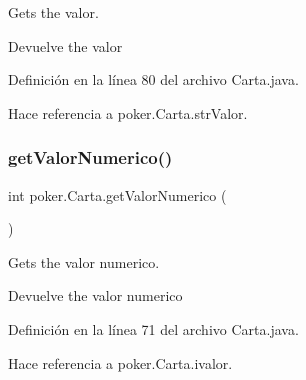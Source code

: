 Gets the valor. 

\begin{DoxyReturn}{Devuelve}
the valor 
\end{DoxyReturn}


Definición en la línea 80 del archivo Carta.\+java.


\begin{DoxyCode}{0}

\end{DoxyCode}


Hace referencia a poker.\+Carta.\+str\+Valor.

\mbox{\label{classpoker_1_1Carta_a24fcaa25f7ab08bdcece39332baaa00c}} 
\subsubsection{\texorpdfstring{getValorNumerico()}{getValorNumerico()}}
{\footnotesize\ttfamily int poker.\+Carta.\+get\+Valor\+Numerico (\begin{DoxyParamCaption}{ }\end{DoxyParamCaption})}



Gets the valor numerico. 

\begin{DoxyReturn}{Devuelve}
the valor numerico 
\end{DoxyReturn}


Definición en la línea 71 del archivo Carta.\+java.


\begin{DoxyCode}{0}

\end{DoxyCode}


Hace referencia a poker.\+Carta.\+ivalor.

\mbox{\label{classpoker_1_1Carta_a80da70637c7b234024b41d63957d7064}} 

